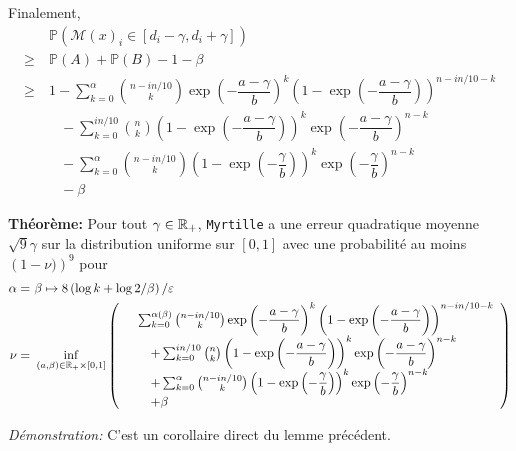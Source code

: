 Finalement,
\begin{align*}
    &\  \mathbb P\left(  \mathcal M(x)_i \in [d_i - \gamma, d_i + \gamma] \right)  \\
    \geq &\   \mathbb P(A) + \mathbb P (B) - 1 - \beta \\
    \geq &\  1 - \sum_{k = 0}^{\alpha} \binom{n - in/10}{k}\exp\left( -\dfrac{a-\gamma}{b} \right)^k \left( 1 - \exp\left( -\dfrac{a-\gamma}{b} \right) \right)^{n - in/10 -k} \\
    & \quad  - \sum_{k = 0}^{in/10} \binom{n}{k} \left( 1 - \exp\left( -\dfrac{a-\gamma}{b} \right) \right)^k \exp\left( -\dfrac{a-\gamma}{b} \right)^{n-k} \\
    & \quad - \sum_{k = 0}^{\alpha} \binom{n - in/10}{k} \left( 1 - \exp\left( -\dfrac{\gamma}{b} \right) \right)^k \exp\left( -\dfrac{\gamma}{b} \right)^{n-k}\\
    & \quad - \beta
\end{align*}

\vspace*{5pt}
\textbf{Théorème: } Pour tout \(\gamma \in \mathbb{R}_+\), \texttt{Myrtille} a une erreur quadratique moyenne \(\sqrt{9}\gamma\) sur la distribution uniforme sur \([0,1]\) avec une probabilité au moins \(\left( 1 - \nu) \right)^9\) pour 
\begin{align*}
    \alpha =&\ \beta \mapsto 8\left( \log k + \log 2/\beta \right)/\varepsilon\\
    \nu = &\ \inf_{(a,\beta) \in \R_+ \times [0,1]} \left( 
        \begin{array}[]{rl}
            &\sum_{k = 0}^{\alpha(\beta)} \binom{n - in/10}{k}\exp\left( -\dfrac{a-\gamma}{b} \right)^k \left( 1 - \exp\left( -\dfrac{a-\gamma}{b} \right) \right)^{n - in/10 -k} \\
            & \quad  + \sum_{k = 0}^{in/10} \binom{n}{k} \left( 1 - \exp\left( -\dfrac{a-\gamma}{b} \right) \right)^k \exp\left( -\dfrac{a-\gamma}{b} \right)^{n-k} \\
            & \quad + \sum_{k = 0}^{\alpha} \binom{n - in/10}{k} \left( 1 - \exp\left( -\dfrac{\gamma}{b} \right) \right)^k \exp\left( -\dfrac{\gamma}{b} \right)^{n-k}\\
            & \quad + \beta 
        \end{array}
    \right)
\end{align*}

\textit{Démonstration:} C'est un corollaire direct du lemme précédent. 



